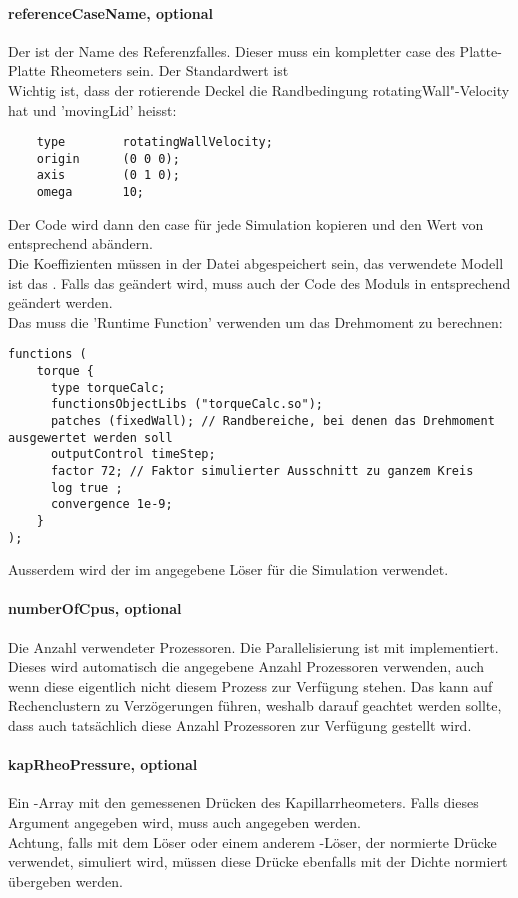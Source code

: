 \paragraph{referenceCaseName, optional}
Der  ist der Name des Referenzfalles. Dieser muss ein kompletter \openfoam{} case des Platte-Platte Rheometers sein. Der Standardwert ist \\
Wichtig ist, dass der rotierende Deckel die Randbedingung rotatingWall"-Velocity hat und 'movingLid' heisst:
\begin{lstlisting}
    type        rotatingWallVelocity;
    origin      (0 0 0);
    axis        (0 1 0);
    omega       10;
\end{lstlisting}
Der Code wird dann den case für jede Simulation kopieren und den Wert von  entsprechend abändern.\\
Die Koeffizienten müssen in der Datei  abgespeichert sein, das verwendete Modell ist das . Falls das geändert wird, muss auch der Code des Moduls in  entsprechend geändert werden.\\
Das  muss die 'Runtime Function'  verwenden um das Drehmoment zu berechnen:
\begin{lstlisting}
functions (
    torque {
      type torqueCalc;
      functionsObjectLibs ("torqueCalc.so");
      patches (fixedWall); // Randbereiche, bei denen das Drehmoment ausgewertet werden soll
      outputControl timeStep;
      factor 72; // Faktor simulierter Ausschnitt zu ganzem Kreis
      log true ;
      convergence 1e-9;
    }
);
\end{lstlisting}
Ausserdem wird der im  angegebene Löser für die Simulation verwendet.
%
\paragraph{numberOfCpus, optional}
Die Anzahl verwendeter Prozessoren. Die Parallelisierung ist mit  implementiert. Dieses wird automatisch die angegebene Anzahl Prozessoren verwenden, auch wenn diese eigentlich nicht diesem Prozess zur Verfügung stehen. Das kann auf Rechenclustern zu Verzögerungen führen, weshalb darauf geachtet werden sollte, dass auch tatsächlich diese Anzahl Prozessoren zur Verfügung gestellt wird.
%
\paragraph{kapRheoPressure, optional}
Ein -Array mit den gemessenen Drücken des Kapillarrheometers. Falls dieses Argument angegeben wird, muss auch  angegeben werden.\\
Achtung, falls mit dem Löser  oder einem anderem \openfoam{}-Löser, der normierte Drücke verwendet, simuliert wird, müssen diese Drücke ebenfalls mit der Dichte normiert übergeben werden.
%
